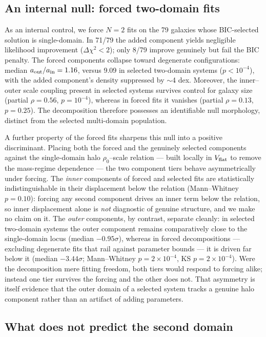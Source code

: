 \documentclass[twocolumn]{aastex631}
\begin{document}
\subsection{An internal null: forced two-domain fits} \label{sec:forced}

As an internal control, we force $N = 2$ fits on the 79 galaxies whose
BIC-selected solution is single-domain. In 71/79 the added component yields
negligible likelihood improvement ($\Delta\chi^2 < 2$); only 8/79 improve
genuinely but fail the BIC penalty. The forced components collapse toward
degenerate configurations: median $a_{\rm out}/a_{\rm in} = 1.16$, versus
9.09 in selected two-domain systems ($p < 10^{-4}$), with the added
component's density suppressed by $\sim$4 dex. Moreover, the inner--outer
scale coupling present in selected systems survives control for galaxy size
(partial $\rho = 0.56$, $p = 10^{-4}$), whereas in forced fits it vanishes
(partial $\rho = 0.13$, $p = 0.25$). The decomposition therefore possesses an
identifiable null morphology, distinct from the selected multi-domain
population.

A further property of the forced fits sharpens this null into a positive
discriminant. Placing both the forced and the genuinely selected components
against the single-domain halo $\rho_0$--scale relation --- built locally in
$V_{\rm flat}$ to remove the mass-regime dependence --- the two component tiers
behave asymmetrically under forcing. The \emph{inner} components of forced and
selected fits are statistically indistinguishable in their displacement below the
relation (Mann--Whitney $p = 0.10$): forcing any second component drives an inner
term below the relation, so inner displacement alone is \emph{not} diagnostic of
genuine structure, and we make no claim on it. The \emph{outer} components, by
contrast, separate cleanly: in selected two-domain systems the outer component
remains comparatively close to the single-domain locus (median $-0.95\sigma$),
whereas in forced decompositions --- excluding degenerate fits that rail against
parameter bounds --- it is driven far below it (median $-3.44\sigma$;
Mann--Whitney $p = 2 \times 10^{-4}$, KS $p = 2 \times 10^{-4}$). Were the
decomposition mere fitting freedom, both tiers would respond to forcing alike;
instead one tier survives the forcing and the other does not. That asymmetry is
itself evidence that the outer domain of a selected system tracks a genuine halo
component rather than an artifact of adding parameters.

\subsection{What does not predict the second domain} \label{sec:negatives}
\end{document}
